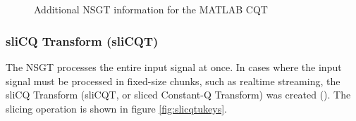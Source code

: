 \documentclass[report.tex]{subfiles}
\begin{document}
\begin{figure}[ht]
	\\
	\\
	\caption{Additional NSGT information for the MATLAB CQT}
	\label{fig:cqtdetails}
\end{figure}

\newpagefill

\subsubsection{sliCQ Transform (sliCQT)}
\label{sec:theoryslicqt}

The NSGT processes the entire input signal at once. In cases where the input signal must be processed in fixed-size chunks, such as realtime streaming, the sliCQ Transform (sliCQT, or sliced Constant-Q Transform) was created (\cite{invertiblecqt, slicq}). The slicing operation is shown in figure \ref{fig:slicqtukeys}.
\end{document}
